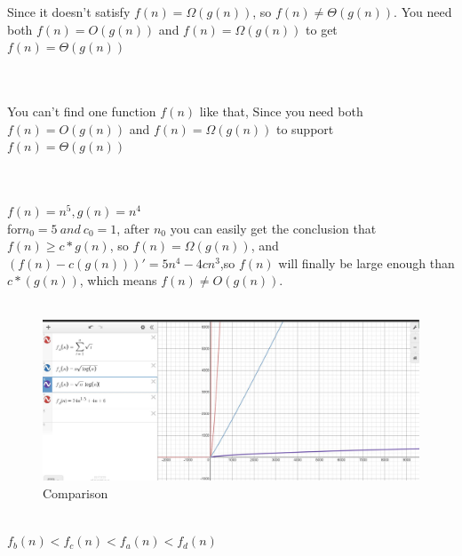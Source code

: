 \documentclass{article}
\begin{document}
Since it doesn't satisfy $f(n) = \Omega (g(n))$, so $f(n) \neq \Theta (g(n))$. You need both $f(n) = O (g(n))$ and $f(n) = \Omega (g(n))$ to get $f(n) =\Theta (g(n))$
\\\\
\\You can't find one function $f(n)$ like that, Since you need both $f(n) = O (g(n))$ and $f(n) = \Omega (g(n))$ to support $f(n) =\Theta (g(n))$
\\\\
\\$f(n)= n^5, g(n)= n^4$
\\for$ n_0 = 5\ and\ c_0 =1$, after $n_0$ you can easily get the conclusion that $f(n) \geq c*g(n)$, so $f(n) = \Omega (g(n))$, and $(f(n)-c(g(n)))'=5n^4-4cn^3$,so $f(n)$ will finally be large enough than $c*(g(n))$, which means $f(n) \neq O (g(n))$.
\\\\
\begin{figure}[h]
    \centering
    \includegraphics[scale=0.3]{hw104.jpg}
    \caption{Comparison}
\end{figure}
\\$f_b(n)<f_c(n)<f_a(n)<f_d(n)$
\end{document}
